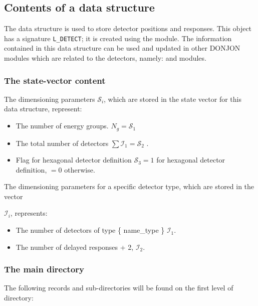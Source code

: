 \subsection{Contents of a  data structure}\label{sect:detectdir}

\vskip 0.2cm
The  data structure is used to store detector positions and 
responses. This object has a signature {\tt L\_DETECT}; it is created using
the  module. The information contained in
this data structure can be used and updated in other DONJON modules
which are related to the detectors, namely:  and 
modules.

\subsubsection{The state-vector content}\label{sect:devicestate}
\noindent
The dimensioning parameters $\mathcal{S}_i$, which are stored in the state
vector for this data structure, represent:

\begin{itemize}

\item  The number of energy
  groups. $N_g = \mathcal{S}_1$

\item  The total number of detectors $\sum
  \mathcal{I}_{1} = \mathcal{S}_2$ . 

\item  Flag for hexagonal detector definition  $\mathcal{S}_3
  = 1$ for hexagonal detector definition,
$= 0$ otherwise.

\end{itemize}

The dimensioning parameters for a specific detector type, which are stored
in the vector 

$\mathcal{I}_{i}$, represents:

\begin{itemize}

\item The number of detectors of type \{ name\_type \} $\mathcal{I}_{1}$.

\item The number of delayed responses + 2, $\mathcal{I}_{2}$.

\end{itemize}

\subsubsection{The main  directory}\label{sect:detectdir}
\noindent
The following records and sub-directories will be found on the first level
of  directory:

